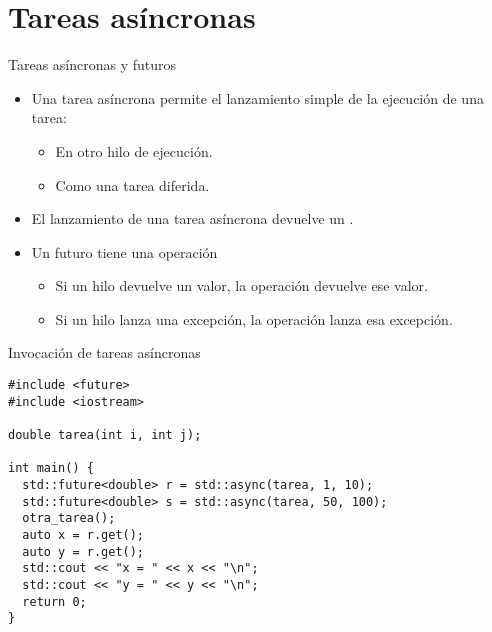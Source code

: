 \section{Tareas asíncronas}

\begin{frame}[t]{Tareas asíncronas y futuros}
\begin{itemize}
  \item Una tarea asíncrona permite el lanzamiento simple de la ejecución de una tarea:
    \begin{itemize}
      \item En otro hilo de ejecución.
      \item Como una tarea diferida.
    \end{itemize}

  \item El lanzamiento de una tarea asíncrona devuelve un .

  \item Un futuro  tiene una operación 
    \begin{itemize}
      \item Si un hilo devuelve un valor, la operación  devuelve ese valor.
      \item Si un hilo lanza una excepción, la operación  lanza esa excepción.
    \end{itemize}
\end{itemize}
\end{frame}

\begin{frame}[t,fragile]{Invocación de tareas asíncronas}
\begin{lstlisting}
#include <future>
#include <iostream>

double tarea(int i, int j);

int main() {
  std::future<double> r = std::async(tarea, 1, 10);
  std::future<double> s = std::async(tarea, 50, 100);
  otra_tarea();
  auto x = r.get();
  auto y = r.get();
  std::cout << "x = " << x << "\n";
  std::cout << "y = " << y << "\n";
  return 0;
}
\end{lstlisting}
\end{frame}
